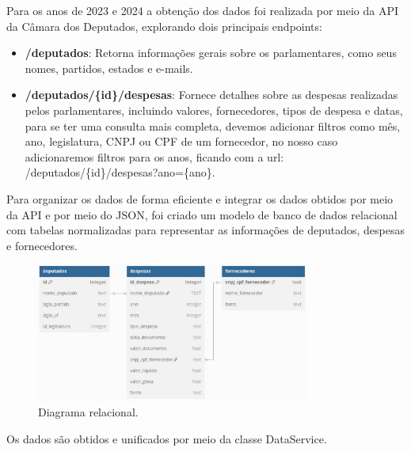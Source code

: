 \documentclass[12pt, a4paper]{article}
\begin{document}
Para os anos de 2023 e 2024 a obtenção dos dados foi realizada por meio da API\cite{dados_abertos} da Câmara dos Deputados, explorando dois principais endpoints:
\begin{itemize}
    \item \textbf{/deputados}: Retorna informações gerais sobre os parlamentares, como seus nomes, partidos, estados e e-mails.
    \item \textbf{/deputados/\{id\}/despesas}: Fornece detalhes sobre as despesas realizadas pelos parlamentares, incluindo valores, fornecedores, tipos de despesa e datas, para se ter uma consulta mais completa, devemos adicionar filtros como mês, ano, legislatura, CNPJ ou CPF de um fornecedor, no nosso caso adicionaremos filtros para os anos, ficando com a url: /deputados/\{id\}/despesas?ano=\{ano\}.
\end{itemize}

Para organizar os dados de forma eficiente e integrar os dados obtidos por meio da API e por meio do JSON, foi criado um modelo de banco de dados relacional com tabelas normalizadas para representar as informações de deputados, despesas e fornecedores\cite{dbdiagram}.

\begin{figure}[htbp]
	\centering
	\includegraphics[width=0.8\textwidth]{assets/1_dbdiagram.png}
	\caption{Diagrama relacional.}
	\label{fig:arquivo_json}
\end{figure}
\newpage

Os dados são obtidos e unificados por meio da classe DataService.
\end{document}
